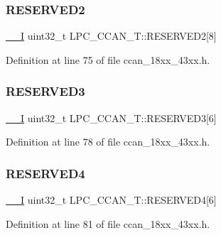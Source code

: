 \subsubsection{\texorpdfstring{R\+E\+S\+E\+R\+V\+E\+D2}{RESERVED2}}
{\footnotesize\ttfamily \hyperlink{core__sc300_8h_af63697ed9952cc71e1225efe205f6cd3}{\+\_\+\+\_\+I} uint32\+\_\+t L\+P\+C\+\_\+\+C\+C\+A\+N\+\_\+\+T\+::\+R\+E\+S\+E\+R\+V\+E\+D2\mbox{[}8\mbox{]}}



Definition at line 75 of file ccan\+\_\+18xx\+\_\+43xx.\+h.

\mbox{\label{struct_l_p_c___c_c_a_n___t_a1f53445ee27872e9963d26a9e18da6aa}} 
\subsubsection{\texorpdfstring{R\+E\+S\+E\+R\+V\+E\+D3}{RESERVED3}}
{\footnotesize\ttfamily \hyperlink{core__sc300_8h_af63697ed9952cc71e1225efe205f6cd3}{\+\_\+\+\_\+I} uint32\+\_\+t L\+P\+C\+\_\+\+C\+C\+A\+N\+\_\+\+T\+::\+R\+E\+S\+E\+R\+V\+E\+D3\mbox{[}6\mbox{]}}



Definition at line 78 of file ccan\+\_\+18xx\+\_\+43xx.\+h.

\mbox{\label{struct_l_p_c___c_c_a_n___t_ad62def3b513603ef31ad365e537671c8}} 
\subsubsection{\texorpdfstring{R\+E\+S\+E\+R\+V\+E\+D4}{RESERVED4}}
{\footnotesize\ttfamily \hyperlink{core__sc300_8h_af63697ed9952cc71e1225efe205f6cd3}{\+\_\+\+\_\+I} uint32\+\_\+t L\+P\+C\+\_\+\+C\+C\+A\+N\+\_\+\+T\+::\+R\+E\+S\+E\+R\+V\+E\+D4\mbox{[}6\mbox{]}}



Definition at line 81 of file ccan\+\_\+18xx\+\_\+43xx.\+h.

